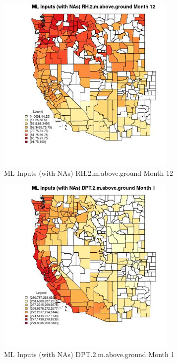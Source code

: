 \begin{figure} 
\centering  
\includegraphics[width=0.77\textwidth]{Code_Outputs/Report_ML_input_PM25_Step4_part_f_de_duplicated_aveswNAs_CountyRH2mabovegroundmedianMonth12.jpg} 
\caption{\label{fig:Report_ML_input_PM25_Step4_part_f_de_duplicated_aveswNAsCountyRH2mabovegroundmedianMonth12}ML Inputs (with NAs) RH.2.m.above.ground Month 12} 
\end{figure} 
 

\clearpage 

\begin{figure} 
\centering  
\includegraphics[width=0.77\textwidth]{Code_Outputs/Report_ML_input_PM25_Step4_part_f_de_duplicated_aveswNAs_CountyDPT2mabovegroundmedianMonth1.jpg} 
\caption{\label{fig:Report_ML_input_PM25_Step4_part_f_de_duplicated_aveswNAsCountyDPT2mabovegroundmedianMonth1}ML Inputs (with NAs) DPT.2.m.above.ground Month 1} 
\end{figure} 
 

